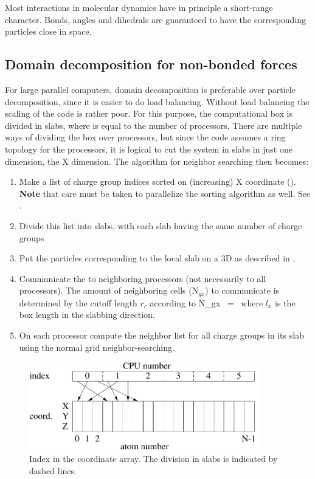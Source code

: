 {Most interactions in molecular dynamics have in principle a
short-range character.  Bonds, angles and dihedrals are guaranteed to
have the corresponding particles close in space.


\subsection{Domain decomposition for non-bonded forces}
For large parallel computers, domain decomposition is preferable over
particle decomposition, since it is easier to do load
balancing. Without load balancing the scaling of the code is rather
poor. For this purpose, the computational box is divided in {\nproc}
slabs, where {\nproc} is equal to the number of processors. There are
multiple ways of dividing the box over processors, but since the
{\gromacs} code assumes a ring topology for the processors, it is
logical to cut the system in slabs in just one dimension, the X
dimension.  The algorithm for neighbor searching then becomes:
\begin{enumerate}
\item   Make a list of charge group indices sorted on (increasing) X coordinate
        ().
        {\bf Note} that care must be taken to parallelize the sorting algorithm
        as well. See .
\item   Divide this list into slabs, with each slab having the same number of
        charge groups
\item   Put the particles corresponding to the local slab on a 3D {\nsgrid} as 
        described in .
\item   Communicate the {\nsgrid} to neighboring processors (not necessarily to all
        processors). The amount of neighboring {\nsgrid} cells (N$_{gx}$) to 
        communicate is determined by the cutoff length $r_c$ according to
        \beq
        N_{gx}  ~=~        
        \eeq
        where $l_x$ is the box length in the slabbing direction. 
\item   On each processor compute the neighbor list for all charge groups in
        its slab using the normal grid neighbor-searching.
\end{enumerate}

\begin{figure}
\centerline{\includegraphics[width=10cm]{plots/parsort}}
\caption[Index in the coordinate array.]{Index in the coordinate
array. The division in slabs is indicated by dashed lines.}
\label{fig:parsort}
\end{figure}

}
